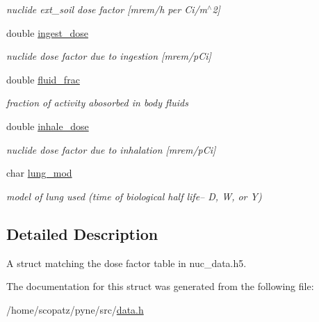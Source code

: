 \begin{DoxyCompactItemize}
\begin{DoxyCompactList}\small\item\em nuclide ext\-\_\-soil dose factor \mbox{[}mrem/h per Ci/m$^\wedge$2\mbox{]} \end{DoxyCompactList}\item 
\hypertarget{structpyne_1_1dose_a96dc0ff17888672afb40c82b3c6bb996}{double \hyperlink{structpyne_1_1dose_a96dc0ff17888672afb40c82b3c6bb996}{ingest\-\_\-dose}}\label{structpyne_1_1dose_a96dc0ff17888672afb40c82b3c6bb996}

\begin{DoxyCompactList}\small\item\em nuclide dose factor due to ingestion \mbox{[}mrem/p\-Ci\mbox{]} \end{DoxyCompactList}\item 
\hypertarget{structpyne_1_1dose_ac5aad706f373cee64e286f6191f753c2}{double \hyperlink{structpyne_1_1dose_ac5aad706f373cee64e286f6191f753c2}{fluid\-\_\-frac}}\label{structpyne_1_1dose_ac5aad706f373cee64e286f6191f753c2}

\begin{DoxyCompactList}\small\item\em fraction of activity abosorbed in body fluids \end{DoxyCompactList}\item 
\hypertarget{structpyne_1_1dose_ade66b3422bf24883142e0de856d67228}{double \hyperlink{structpyne_1_1dose_ade66b3422bf24883142e0de856d67228}{inhale\-\_\-dose}}\label{structpyne_1_1dose_ade66b3422bf24883142e0de856d67228}

\begin{DoxyCompactList}\small\item\em nuclide dose factor due to inhalation \mbox{[}mrem/p\-Ci\mbox{]} \end{DoxyCompactList}\item 
\hypertarget{structpyne_1_1dose_afc70c9461a6c1e3348a90e66747db41e}{char \hyperlink{structpyne_1_1dose_afc70c9461a6c1e3348a90e66747db41e}{lung\-\_\-mod}}\label{structpyne_1_1dose_afc70c9461a6c1e3348a90e66747db41e}

\begin{DoxyCompactList}\small\item\em model of lung used (time of biological half life-- D, W, or Y) \end{DoxyCompactList}\end{DoxyCompactItemize}


\subsection{Detailed Description}
A struct matching the dose factor table in nuc\-\_\-data.\-h5. 

The documentation for this struct was generated from the following file\-:\begin{DoxyCompactItemize}
\item 
/home/scopatz/pyne/src/\hyperlink{data_8h}{data.\-h}\end{DoxyCompactItemize}
